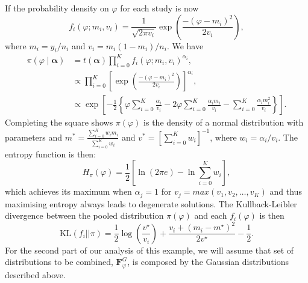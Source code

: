 \documentclass[a4paper, notitlepage, 11pt]{article}
\begin{document}
If the  probability density on $\varphi$ for each study is now
$$ f_i(\varphi; m_i, v_i) = \frac{1}{\sqrt{2\pi v_i}} \exp\left(\frac{-(\varphi-m_i)^2}{2v_i}\right), $$
where $m_i = y_i/n_i$ and $v_i = m_i(1-m_i)/n_i$.
We have
\begin{align}
\nonumber
\pi(\varphi \mid \boldsymbol\alpha)&= t(\boldsymbol\alpha)\prod_{i=0}^{K}f_i(\varphi; m_i, v_i)^{\alpha_i},\\
\nonumber
&\propto \prod_{i=0}^{K} \left[ \exp\left(\frac{-(\varphi-m_i)^2}{2v_i}\right) \right]^{\alpha_i},\\
&\propto \exp\left[-\frac{1}{2}\left\{\varphi\sum_{i=0}^K\frac{\alpha_i}{v_i} - 2\varphi\sum_{i=0}^K \frac{\alpha_im_i}{v_i} - \sum_{i=0}^K\frac{\alpha_im_i^2}{v_i} \right\}\right].
\end{align}
Completing the square shows $\pi(\varphi)$ is the density of a normal distribution with parameters and $m^* = \frac{\sum_{i=0}^K w_im_i}{\sum_{i=0}^K w_i}$ and $v^* = [\sum_{i=0}^K w_i]^{-1}$,  where $w_i = \alpha_i/v_i$.
The entropy function is then:
\begin{equation}
 \label{eq:normalpoolentropy}
 H_{\pi}(\varphi) = \frac{1}{2}\left[ \ln(2\pi e) - \ln\sum_{i=0}^K w_i\right],
\end{equation}
which achieves its maximum when $\alpha_j = 1$ for $v_j = max(v_1, v_2, \ldots, v_K)$ and thus maximising entropy always leads to degenerate solutions.
The Kullback-Leibler divergence between the pooled distribution $\pi(\varphi)$ and each $f_i(\varphi)$ is then
\begin{equation}
 \label{eq:KL_Gaussian}
  \text{KL}( f_i || \pi) = \frac{1}{2}\log\left(\frac{v^\star}{v_i}\right) + \frac{v_i + (m_i-m^\star)^2}{2v^\star} - \frac{1}{2}.
\end{equation}
For the second part of our analysis of this example, we will assume that set of distributions to be combined, $\boldsymbol F^{G}_\varphi$, is composed by the Gaussian distributions described above.
\end{document}

